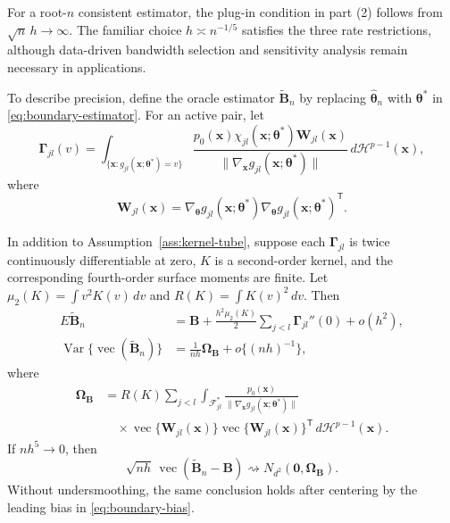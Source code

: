 For a root-$n$ consistent estimator, the plug-in condition in part (2) follows
from $\sqrt n\,h\to\infty$.  The familiar choice $h\asymp n^{-1/5}$ satisfies
the three rate restrictions, although data-driven bandwidth selection and
sensitivity analysis remain necessary in applications.

To describe precision, define the oracle estimator
$\widetilde{\mathbf{B}}_n$ by replacing
$\widehat{\boldsymbol{\theta}}_n$ with $\boldsymbol{\theta}^*$ in
\eqref{eq:boundary-estimator}.  For an active pair, let
\begin{equation}
 \boldsymbol{\Gamma}_{jl}(v)
 =\int_{\{\mathbf{x}:g_{jl}(\mathbf{x};\boldsymbol{\theta}^*)=v\}}
 \frac{p_0(\mathbf{x})\chi_{jl}(\mathbf{x};\boldsymbol{\theta}^*)
 \mathbf{W}_{jl}(\mathbf{x})}
 {\|\nabla_{\mathbf{x}}g_{jl}(\mathbf{x};\boldsymbol{\theta}^*)\|}
 \,d\mathcal H^{p-1}(\mathbf{x}),
 \label{eq:surface-moment}
\end{equation}
where
\begin{equation}
 \mathbf{W}_{jl}(\mathbf{x})
 =\nabla_{\boldsymbol{\theta}}g_{jl}(\mathbf{x};\boldsymbol{\theta}^*)
  \nabla_{\boldsymbol{\theta}}g_{jl}(\mathbf{x};\boldsymbol{\theta}^*)^\mathsf T.
 \label{eq:boundary-outer-product}
\end{equation}

\begin{theorem}
\label{thm:boundary-oracle-clt}
In addition to Assumption~\ref{ass:kernel-tube}, suppose each
$\boldsymbol{\Gamma}_{jl}$ is twice continuously differentiable at zero,
$K$ is a second-order kernel, and the corresponding fourth-order surface
moments are finite.  Let
$\mu_2(K)=\int v^2K(v)\,dv$ and $R(K)=\int K(v)^2\,dv$.  Then
\begin{align}
 E\widetilde{\mathbf{B}}_n
 &=\mathbf{B}+\frac{h^2\mu_2(K)}2
   \sum_{j<l}\boldsymbol{\Gamma}_{jl}''(0)+o(h^2),
 \label{eq:boundary-bias}\\
 \operatorname{Var}\{\operatorname{vec}(\widetilde{\mathbf{B}}_n)\}
 &=\frac1{nh}\boldsymbol{\Omega}_{\mathbf{B}}
   +o\{(nh)^{-1}\},
 \label{eq:boundary-variance}
\end{align}
where
\begin{equation}
\begin{aligned}
 \boldsymbol{\Omega}_{\mathbf{B}}
 &=R(K)\sum_{j<l}\int_{\mathcal F_{jl}^*}
 \frac{p_0(\mathbf{x})}
 {\|\nabla_{\mathbf{x}}g_{jl}(\mathbf{x};\boldsymbol{\theta}^*)\|}\\
 &\quad\times
 \operatorname{vec}\{\mathbf{W}_{jl}(\mathbf{x})\}
 \operatorname{vec}\{\mathbf{W}_{jl}(\mathbf{x})\}^\mathsf T
 \,d\mathcal H^{p-1}(\mathbf{x}).
\end{aligned}
 \label{eq:boundary-asymptotic-variance}
\end{equation}
If $nh^5\to0$, then
\begin{equation}
 \sqrt{nh}\,\operatorname{vec}
 (\widetilde{\mathbf{B}}_n-\mathbf{B})
 \rightsquigarrow N_{d^2}(\mathbf{0},\boldsymbol{\Omega}_{\mathbf{B}}).
 \label{eq:boundary-oracle-clt}
\end{equation}
Without undersmoothing, the same conclusion holds after centering by the
leading bias in \eqref{eq:boundary-bias}.
\end{theorem}

